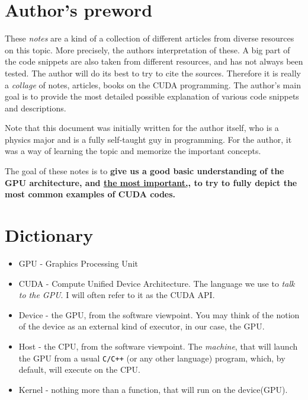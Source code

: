 
\section*{Author's preword}
\label{disclaimer}
These \textit{notes} are a kind of a collection of different articles from diverse resources on this topic. More precisely, the authors interpretation 
of these. A big part of the code snippets 
are also taken from different resources, 
and has not always been tested. The author will do its best to try to cite the sources. 
Therefore it is really a \textit{collage} of notes, articles, books on the CUDA programming.
The author's main goal is to provide the most detailed possible explanation of 
various code snippets and descriptions.

Note that this document was initially written for the author itself, who is a physics major 
and is a fully self-taught guy in programming. 
For the author, it was a way of learning the topic and memorize 
the important concepts. 

The goal of these notes is to \textbf{give us a good basic understanding of the 
GPU architecture, and \underline{the most important,}, to try to fully depict
the most common examples of CUDA codes.} 

\section*{Dictionary}
\label{section:dictionary}
\begin{itemize}
   \setlength\itemsep{-0.5em}
   \item GPU - Graphics Processing Unit
   \item CUDA - Compute Unified Device Architecture. The language we use to \textit{talk to the GPU}. I will often refer to it as the CUDA API. 
   \item Device - the GPU, from the software viewpoint. You may think of the notion of the 
   device as an external kind of executor, in our case, the GPU.
   \item Host - the CPU, from the software viewpoint. The \textit{machine}, that will launch the GPU from a
    usual \verb|C/C++| (or any other language) program, which, by default, will execute on the CPU.
   \item Kernel - nothing more than a function, that will run on the device(GPU).
\end{itemize}



\newpage

